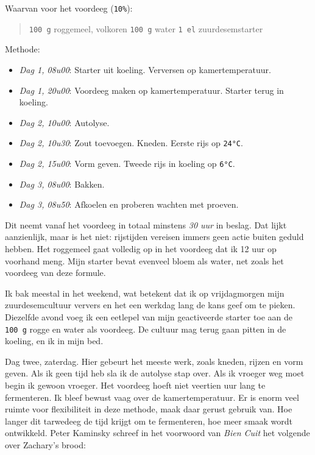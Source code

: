 \documentclass[
  11pt,
  dutch,
]{memoir}
\providecommand{\tightlist}{%
  \setlength{\itemsep}{0pt}\setlength{\parskip}{0pt}}
\begin{document}
Waarvan voor het voordeeg (\texttt{10\%}):

\begin{quote}
\texttt{100\ g} roggemeel, volkoren \newline \texttt{100\ g} water
\newline \texttt{1\ el} zuurdesemstarter
\end{quote}

Methode:

\begin{itemize}
\tightlist
\item
  \emph{Dag 1, 08u00}: Starter uit koeling. Verversen op
  kamertemperatuur.
\item
  \emph{Dag 1, 20u00}: Voordeeg maken op kamertemperatuur. Starter terug
  in koeling.
\item
  \emph{Dag 2, 10u00}: Autolyse.
\item
  \emph{Dag 2, 10u30}: Zout toevoegen. Kneden. Eerste rijs op
  \texttt{24°C}.
\item
  \emph{Dag 2, 15u00}: Vorm geven. Tweede rijs in koeling op
  \texttt{6°C}.
\item
  \emph{Dag 3, 08u00}: Bakken.
\item
  \emph{Dag 3, 08u50}: Afkoelen en proberen wachten met proeven.
\end{itemize}

Dit neemt vanaf het voordeeg in totaal minstens \emph{30 uur} in beslag.
Dat lijkt aanzienlijk, maar is het niet: rijstijden vereisen immers geen
actie buiten geduld hebben. Het roggemeel gaat volledig op in het
voordeeg dat ik 12 uur op voorhand meng. Mijn starter bevat evenveel
bloem als water, net zoals het voordeeg van deze formule.

Ik bak meestal in het weekend, wat betekent dat ik op vrijdagmorgen mijn
zuurdesemcultuur ververs en het een werkdag lang de kans geef om te
pieken. Diezelfde avond voeg ik een eetlepel van mijn geactiveerde
starter toe aan de \texttt{100\ g} rogge en water als voordeeg. De
cultuur mag terug gaan pitten in de koeling, en ik in mijn bed.

Dag twee, zaterdag. Hier gebeurt het meeste werk, zoals kneden, rijzen
en vorm geven. Als ik geen tijd heb sla ik de autolyse stap over. Als ik
vroeger weg moet begin ik gewoon vroeger. Het voordeeg hoeft niet
veertien uur lang te fermenteren. Ik bleef bewust vaag over de
kamertemperatuur. Er is enorm veel ruimte voor flexibiliteit in deze
methode, maak daar gerust gebruik van. Hoe langer dit tarwedeeg de tijd
krijgt om te fermenteren, hoe meer smaak wordt ontwikkeld. Peter
Kaminsky schreef in het voorwoord van \emph{Bien Cuit} het volgende over
Zachary's brood:
\end{document}
